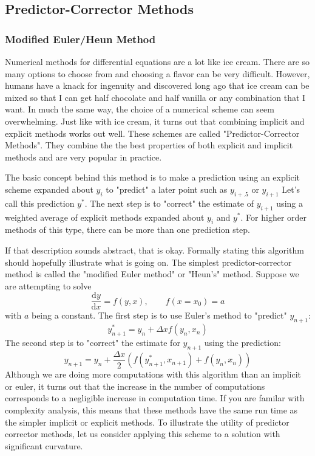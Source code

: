 \documentclass[]{article}
\theoremstyle{definition}
\numberwithin{equation}{section}
\begin{document}
	\subsection{Predictor-Corrector Methods}
	\subsubsection{Modified Euler/Heun Method}
	Numerical methods for differential equations are a lot like ice cream. There are so many options to choose from and choosing a flavor can be very difficult. However, humans have a knack for ingenuity and discovered long ago that ice cream can be mixed so that I can get half chocolate and half vanilla or any combination that I want. In much the same way, the choice of a numerical scheme can seem overwhelming. Just like with ice cream, it turns out that combining implicit and explicit methods works out well. These schemes are called "Predictor-Corrector Methods". They combine the the best properties of both explicit and implicit methods and are very popular in practice.
	
	The basic concept behind this method is to make a prediction using an explicit scheme expanded about $y_i$ to "predict" a later point such as $y_{i+.5}$ or $y_{i+1}$ Let's call this prediction $y^*$. The next step is to "correct" the estimate of $y_{i+1}$ using a weighted average of explicit methods expanded about $y_i$ and $y^*$. For higher order methods of this type, there can be more than one prediction step.

	If that description sounds abstract, that is okay. Formally stating this algorithm should hopefully illustrate what is going on. The simplest predictor-corrector method is called the "modified Euler method" or "Heun's" method. Suppose we are attempting to solve
	\begin{equation}
		\frac{\text{d}y}{\text{d}x} = f(y,x) , \qquad f(x=x_0) = a \label{ModEulerDE}
	\end{equation}
	with $a$ being a constant. The first step is to use Euler's method to "predict" $y_{n+1}$:
	\begin{equation}
		y^*_{n+1} = y_{n} + \Delta x f(y_n,x_n)
	\end{equation}
	The second step is to "correct" the estimate for $y_{n+1}$ using the prediction:
	\begin{equation}
		y_{n+1} = y_n +  \frac{\Delta x}{2} \left(f(y^*_{n+1},x_{n+1}) + f(y_n,x_n)\right)
	\end{equation}
	Although we are doing more computations with this algorithm than an implicit or euler, it turns out that the increase in the number of computations corresponds to a negligible increase in computation time. If you are familar with complexity analysis, this means that these methods have the same run time as the simpler implicit or explicit methods. To illustrate the utility of predictor corrector methods, let us consider applying this scheme to a solution with significant curvature.
	
\end{document}
